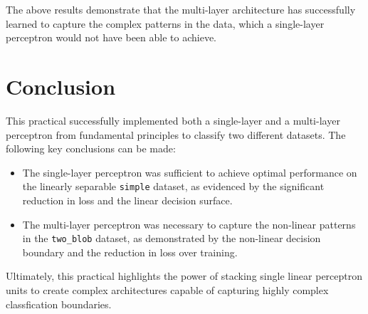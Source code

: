 \documentclass[11pt]{article}
\begin{document}
\newpage
The above results demonstrate that the multi-layer architecture has successfully learned to capture the complex patterns in the data, which a single-layer perceptron would not have been able to achieve.

\section*{Conclusion}
This practical successfully implemented both a single-layer and a multi-layer perceptron from fundamental principles to classify two different 
datasets. The following key conclusions can be made: 
\begin{itemize}
  \item The single-layer perceptron was sufficient to achieve optimal performance on the linearly separable \texttt{simple} dataset, as evidenced by the significant reduction in loss and the linear decision surface.
  \item The multi-layer perceptron was necessary to capture the non-linear patterns in the \texttt{two\_blob} dataset, as demonstrated by the non-linear decision boundary and the reduction in loss over training.
\end{itemize}

Ultimately, this practical highlights the power of stacking single linear perceptron units to create complex architectures capable of capturing highly complex classfication boundaries.
\end{document}
